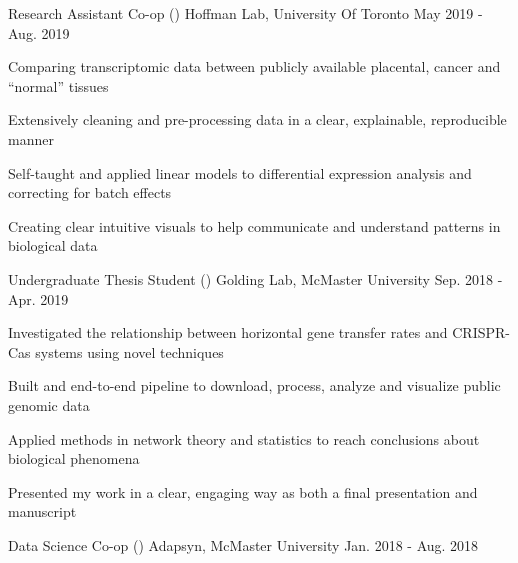 \begin{cventries}
    \cventry
    {Research Assistant Co-op ()}
      {Hoffman Lab, University Of Toronto}
      {May 2019 - Aug. 2019}
      {}%
      {
        \begin{cvitems}
         \item {Comparing transcriptomic data between publicly available placental, cancer and ``normal'' tissues}
         \item {Extensively cleaning and pre-processing data in a clear, explainable, reproducible manner}
         \item {Self-taught and applied linear models to differential expression analysis and correcting for batch effects}
         \item {Creating clear intuitive visuals to help communicate and understand patterns in biological data}
        \end{cvitems}
      }
    \cventry
      {Undergraduate Thesis Student ()}
      {Golding Lab, McMaster University}
      {Sep. 2018 - Apr. 2019}
      {}%
      {
        \begin{cvitems}
         \item {Investigated the relationship between horizontal gene transfer rates and CRISPR-Cas systems using novel techniques}
         \item {Built and end-to-end pipeline to download, process, analyze and visualize public genomic data}
         \item {Applied methods in network theory and statistics to reach conclusions about biological phenomena}
         \item {Presented my work in a clear, engaging way as both a final presentation and manuscript}
        \end{cvitems}
      }
    \cventry
      {Data Science Co-op ()}
      {Adapsyn, McMaster University}
      {Jan. 2018 - Aug. 2018}

\end{cventries}
